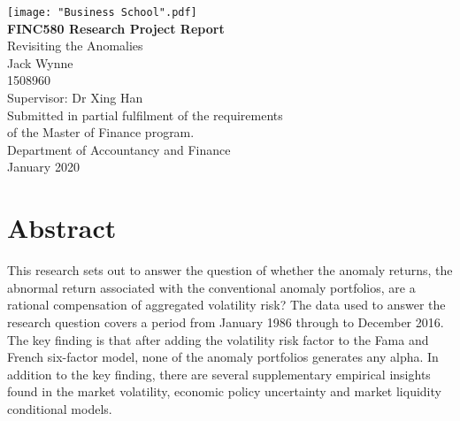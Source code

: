 \documentclass[12pt, a4paper, oneside]{article}
\begin{document}
\thispagestyle{empty}
\begin{center}

\vspace{-2em}\texttt{[image: "Business School".pdf]} \\
\vspace{0.9cm}
\Large \textbf{FINC580 Research Project Report} \\
\vspace{1.8cm}
\LARGE Revisiting the Anomalies
\\
\vspace{1.8cm}
\LARGE Jack Wynne \\
\Large 1508960 \\
\vspace{0.45cm}
\Large Supervisor: Dr Xing Han \\
\vfill
\normalsize
Submitted in partial fulfilment of the requirements\\
of the Master of Finance program. \\
\vspace{0.45cm}
Department of Accountancy and Finance \\
\vspace{0.45cm}
January 2020
\vspace{2.7cm}
\end{center}

\raggedbottom
\pagebreak
\thispagestyle{plain}
\section*{\centering Abstract}
\vspace{0.45cm}
\doublespacing
This research sets out to answer the question of whether the anomaly returns, the abnormal return associated with the conventional anomaly portfolios, are a rational compensation of aggregated volatility risk? The data used to answer the research question covers a period from January 1986 through to December 2016. The key finding is that after adding the volatility risk factor to the Fama and French six-factor model, none of the anomaly portfolios generates any alpha. In addition to the key finding, there are several supplementary empirical insights found in the market volatility, economic policy uncertainty and market liquidity conditional models.

\raggedbottom
\pagebreak
\end{document}
